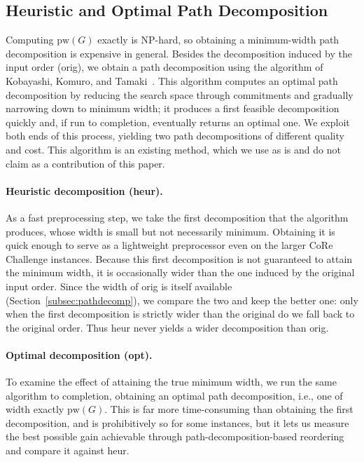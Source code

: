 \documentclass[conference]{IEEEtran}
\newcommand{\OrigDecom}{\textsf{orig}\xspace}
\newcommand{\HeurDecom}{\textsf{heur}\xspace}
\newcommand{\OptDecom}{\textsf{opt}\xspace}
\begin{document}
\subsection{Heuristic and Optimal Path Decomposition}
\label{subsec:algorithms}

Computing $\mathrm{pw}(G)$ exactly is NP-hard, so obtaining a minimum-width path
decomposition is expensive in general. Besides the decomposition induced by the
input order (\OrigDecom), we obtain a path decomposition using the algorithm of
Kobayashi, Komuro, and Tamaki~\cite{KobayashiKomuroTamaki2014}. This algorithm
computes an optimal path decomposition by reducing the search space through
commitments and gradually narrowing down to minimum width; it produces a first
feasible decomposition quickly and, if run to completion, eventually returns an
optimal one. We exploit both ends of this process, yielding two path
decompositions of different quality and cost. This algorithm is an existing
method, which we use as is and do not claim as a contribution of this paper.

\paragraph{Heuristic decomposition (\HeurDecom).}
As a fast preprocessing step, we take the first decomposition that the algorithm
produces, whose width is small but not necessarily minimum. Obtaining it is
quick enough to serve as a lightweight preprocessor even on the larger CoRe
Challenge instances. Because this first decomposition is not guaranteed to attain
the minimum width, it is occasionally wider than the one induced by the original
input order. Since the width of \OrigDecom is itself available
(Section~\ref{subsec:pathdecomp}), we compare the two and keep the better one:
only when the first decomposition is strictly wider than the original do we fall
back to the original order. Thus \HeurDecom never yields a wider decomposition
than \OrigDecom.

\paragraph{Optimal decomposition (\OptDecom).}
To examine the effect of attaining the true minimum width, we run the same
algorithm to completion, obtaining an optimal path decomposition, i.e., one of
width exactly $\mathrm{pw}(G)$. This is far more time-consuming than obtaining the
first decomposition, and is prohibitively so for some instances, but it lets us
measure the best possible gain achievable through path-decomposition-based
reordering and compare it against \HeurDecom.
\end{document}

